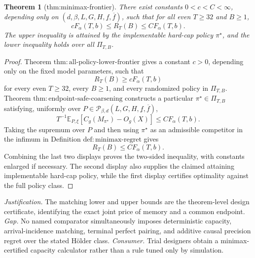 \documentclass{article}
\newtheorem{theorem}{Theorem}
\begin{document}
\begin{theorem}[thm:minimax-frontier]\label{thm:minimax-frontier}
There exist constants \(0<c<C<\infty\), depending only on \((d,\beta,L,G,H,\underline f,\overline f)\), such that for all even \(T\ge32\) and \(B\ge1\), \[cF_\alpha(T,b)\le R_T(B)\le CF_\alpha(T,b).\] The upper inequality is attained by the implementable hard-cap policy \(\pi^\star\), and the lower inequality holds over all \(\Pi_{T,B}\).
\end{theorem}
\begin{proof}
Theorem \(\mathrm{thm:all\text{-}policy\text{-}lower\text{-}frontier}\) gives a constant \(c>0\), depending only on the fixed model parameters, such that
\[
 R_T(B)\ge cF_\alpha(T,b)
\]
for every even \(T\ge32\), every \(B\ge1\), and every randomized policy in \(\Pi_{T,B}\).  Theorem \(\mathrm{thm:endpoint\text{-}safe\text{-}coarsening}\) constructs a particular \(\pi^\star\in\Pi_{T,B}\) satisfying, uniformly over \(P\in\mathcal P_{\beta,d}(L,G,H,\underline f,\overline f)\),
\[
 T^{-1}\mathbb E_{P,\xi}\!\left[C_g(M_{\pi^\star})-O_g(X)\right]
 \le C F_\alpha(T,b).
\]
Taking the supremum over \(P\) and then using \(\pi^\star\) as an admissible competitor in the infimum in Definition \(\mathrm{def:minimax\text{-}regret}\) gives
\[
 R_T(B)\le C F_\alpha(T,b).
\]
Combining the last two displays proves the two-sided inequality, with constants enlarged if necessary.  The second display also supplies the claimed attaining implementable hard-cap policy, while the first display certifies optimality against the full policy class.
\end{proof}
\par\smallskip\noindent \textit{Justification.} The matching lower and upper bounds are the theorem-level design certificate, identifying the exact joint price of memory and a common endpoint. \textit{Gap.} No named comparator simultaneously imposes deterministic capacity, arrival-incidence matching, terminal perfect pairing, and additive causal precision regret over the stated Hölder class. \textit{Consumer.} Trial designers obtain a minimax-certified capacity calculator rather than a rule tuned only by simulation.
\end{document}
